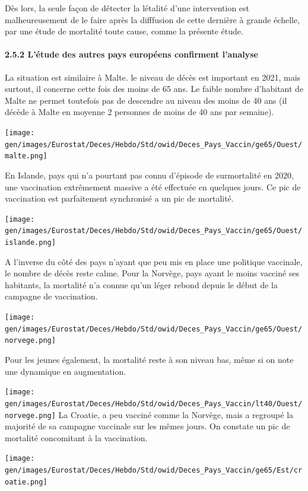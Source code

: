 \documentclass[
]{article}
\begin{document}
Dès lors, la seule façon de détecter la létalité d'une intervention est
malheureusement de le faire après la difffusion de cette dernière à
grande échelle, par une étude de mortalité toute cause, comme la
présente étude.

\hypertarget{luxe9tude-des-autres-pays-europuxe9ens-confirment-lanalyse}{%
\paragraph{2.5.2 L'étude des autres pays européens confirment
l'analyse}\label{luxe9tude-des-autres-pays-europuxe9ens-confirment-lanalyse}}

La situation est similaire à Malte. le niveau de décès est important en
2021, mais surtout, il concerne cette fois des moins de 65 ans. Le
faible nombre d'habitant de Malte ne permet toutefois pas de descendre
au niveau des moins de 40 ans (il décède à Malte en moyenne 2 personnes
de moins de 40 ans par semaine).

\texttt{[image: gen/images/Eurostat/Deces/Hebdo/Std/owid/Deces\_Pays\_Vaccin/ge65/Ouest/malte.png]}

En Islande, pays qui n'a pourtant pas connu d'épisode de surmortalité en
2020, une vaccination extrêmement massive a été effectuée en quelques
jours. Ce pic de vaccination est parfaitement synchronisé a un pic de
mortalité.

\texttt{[image: gen/images/Eurostat/Deces/Hebdo/Std/owid/Deces\_Pays\_Vaccin/ge65/Ouest/islande.png]}

A l'inverse du côté des pays n'ayant que peu mis en place une politique
vaccinale, le nombre de décès reste calme. Pour la Norvège, pays ayant
le moins vacciné ses habitants, la mortalité n'a connue qu'un léger
rebond depuis le début de la campagne de vaccination.

\texttt{[image: gen/images/Eurostat/Deces/Hebdo/Std/owid/Deces\_Pays\_Vaccin/ge65/Ouest/norvege.png]}

Pour les jeunes également, la mortalité reste à son niveau bas, même si
on note une dynamique en augmentation.

\texttt{[image: gen/images/Eurostat/Deces/Hebdo/Std/owid/Deces\_Pays\_Vaccin/lt40/Ouest/norvege.png]}
La Croatie, a peu vacciné comme la Norvège, mais a regroupé la majorité
de sa campagne vaccinale sur les mêmes jours. On constate un pic de
mortalité concomitant à la vaccination.

\texttt{[image: gen/images/Eurostat/Deces/Hebdo/Std/owid/Deces\_Pays\_Vaccin/ge65/Est/croatie.png]}
\end{document}
